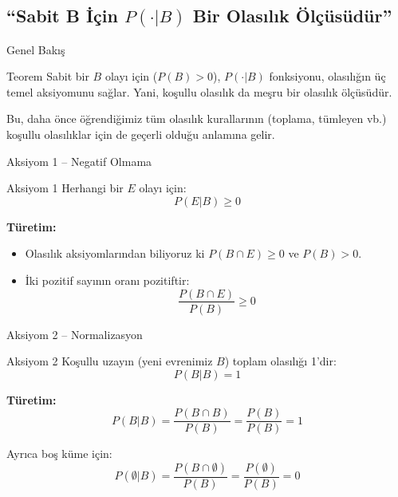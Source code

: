 \documentclass[light]{lutbeamer}
\begin{document}
\subsection{``Sabit B İçin $P(\cdot|B)$ Bir Olasılık Ölçüsüdür''}

\begin{frame}{Genel Bakış}
    \begin{block}{Teorem}
        Sabit bir $B$ olayı için ($P(B)>0$), $P(\cdot|B)$ fonksiyonu, olasılığın üç temel aksiyomunu sağlar. Yani, koşullu olasılık da meşru bir olasılık ölçüsüdür.
    \end{block}
    
    Bu, daha önce öğrendiğimiz tüm olasılık kurallarının (toplama, tümleyen vb.) koşullu olasılıklar için de geçerli olduğu anlamına gelir.
\end{frame}

\begin{frame}[fragile]{Aksiyom 1 -- Negatif Olmama}
    \begin{block}{Aksiyom 1}
        Herhangi bir $E$ olayı için:
        \[ P(E|B) \geq 0 \]
    \end{block}

    \textbf{Türetim:}
    \begin{itemize}
        \item Olasılık aksiyomlarından biliyoruz ki $P(B \cap E) \geq 0$ ve $P(B) > 0$.
        \item İki pozitif sayının oranı pozitiftir:
        \[ \frac{P(B \cap E)}{P(B)} \geq 0 \]
    \end{itemize}
\end{frame}

\begin{frame}[fragile]{Aksiyom 2 -- Normalizasyon}
    \begin{block}{Aksiyom 2}
        Koşullu uzayın (yeni evrenimiz $B$) toplam olasılığı 1'dir:
        \[ P(B|B) = 1 \]
    \end{block}

    \textbf{Türetim:}
    \[ P(B|B) = \frac{P(B \cap B)}{P(B)} = \frac{P(B)}{P(B)} = 1 \]
    
    Ayrıca boş küme için:
    \[ P(\emptyset|B) = \frac{P(B \cap \emptyset)}{P(B)} = \frac{P(\emptyset)}{P(B)} = 0 \]
\end{frame}
\end{document}

